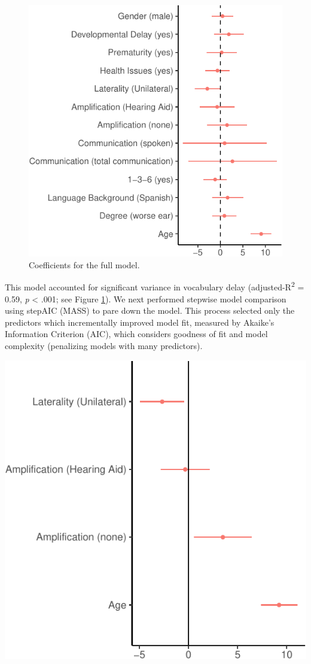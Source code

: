 \documentclass[
  english,
  man]{apa6}
\begin{document}
\begin{figure}
\centering
\includegraphics{ELSSP_paper_files/figure-latex/full-delay-betas-1.pdf}
\caption{\label{fig:full-delay-betas}Coefficients for the full model.}
\end{figure}

This model accounted for significant variance in vocabulary delay (adjusted-R\textsuperscript{2} = 0.59, \emph{p} \textless{} .001; see Figure \ref{fig:full-delay-betas}). We next performed stepwise model comparison using stepAIC (MASS) to pare down the model. This process selected only the predictors which incrementally improved model fit, measured by Akaike's Information Criterion (AIC), which considers goodness of fit and model complexity (penalizing models with many predictors).

\includegraphics{ELSSP_paper_files/figure-latex/delay-betas-1.pdf}
\end{document}
